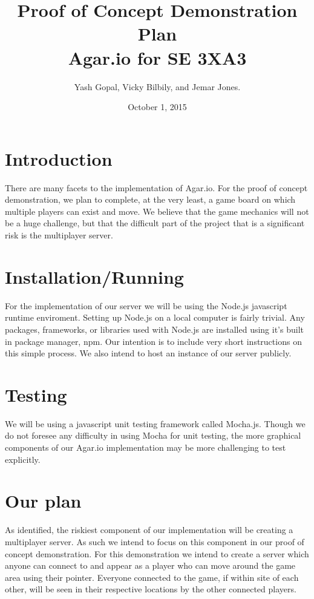 \documentclass[12pt]{article}
\title{Proof of Concept Demonstration Plan\\
	\large Agar.io for SE 3XA3}
\author{Yash Gopal, Vicky Bilbily, and Jemar Jones.}
\date{October 1, 2015}
\begin{document}
\maketitle


\section*{Introduction}
	 There are many facets to the implementation of Agar.io. For the proof of concept demonstration, we plan to complete, at the very least, a game board on which multiple players can exist and move. We believe that the game mechanics will not be a huge challenge, but that the difficult part of the project that is a significant risk is the multiplayer server.
\section*{Installation/Running}
	For the implementation of our server we will be using the Node.js javascript runtime enviroment. Setting up Node.js on a local computer is fairly trivial. Any packages, frameworks, or libraries used with Node.js are installed using it's built in package manager, npm. Our intention is to include very short instructions on this simple process. We also intend to host an instance of our server publicly. 
\section*{Testing}
	We will be using a javascript unit testing framework called Mocha.js. Though we do not foresee any difficulty in using Mocha for unit testing, the more graphical components of our Agar.io implementation may be more challenging to test explicitly.
\section*{Our plan}
	As identified, the riskiest component of our implementation will be creating a multiplayer server. As such we intend to focus on this component in our proof of concept demonstration. For this demonstration we intend to create a server which anyone can connect to and appear as a player who can move around the game area using their pointer. Everyone connected to the game, if within site of each other, will be seen in their respective locations by the other connected players. 
\end{document}
